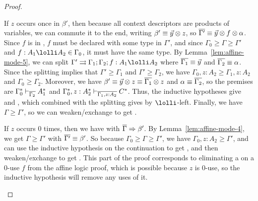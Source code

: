 \begin{proof}
\begin{itemize}
  If $z$ occurs once in $\beta'$, then because all context descriptors
  are products of variables, we can commute it to the end, writing
  $\beta' \equiv \vec{y} \otimes z$, so $\overline{\Gamma'} \equiv \vec{y}
  \otimes f \otimes \alpha$.  Since $f$ is in , $f$ must
  be declared with some type in $\Gamma'$, and since $\Gamma_0 \ge
  \Gamma \ge \Gamma'$ and $f:A_1 \lolli A_2 \in \Gamma_0$, it must have
  the same type.  By Lemma~\ref{lem:affine-mode-5}, we can split
  $\Gamma' \splits \Gamma_1;\Gamma_2;f:A_1 \lolli A_2$ where
  $\overline{\Gamma_1} \equiv \vec{y}$ and $\overline{\Gamma_2} \equiv \alpha$.
  Since the splitting implies that $\Gamma' \ge \Gamma_1$ and $\Gamma'
  \ge \Gamma_2$, we have $\Gamma_0,z:A_2 \ge \Gamma_1,z:A_2$ and
  $\Gamma_0 \ge \Gamma_2$.  Moreover, we have $\beta' \equiv \vec{y}
  \otimes z \equiv \overline{\Gamma_1} \otimes z$ and $\alpha \equiv
  \overline{\Gamma_2}$, so the premises are
  $\Gamma_0^* \vdash_{\overline{\Gamma_2}} A_1^*$ and
  $\Gamma_0^*,z:A_2^* \vdash_{\overline{\Gamma_1,z:A_2}} C^*$.  Thus, the
  inductive hypotheses give  and
  , which combined with the splitting gives
   by $\lolli$-left.  Finally, we have $\Gamma \ge
  \Gamma'$, so we can weaken/exchange to get .

  If $z$ occurs 0 times, then we have
   with $\overline{\Gamma} \Rightarrow \beta'$.
  By Lemma~\ref{lem:affine-mode-4}, we get $\Gamma \ge \Gamma'$ with
  $\overline{\Gamma'} \equiv \beta'$. So because $\Gamma_0 \ge \Gamma \ge
  \Gamma'$, we have $\Gamma_0,z:A_2 \ge \Gamma'$, and can use the
  inductive hypothesis on the continuation to get , and
  then weaken/exchange to get . This part of the proof
  corresponds to eliminating a \UL\/ on a 0-use $f$ from the affine
  logic proof, which is possible because $z$ is 0-use, so the inductive
  hypothesis will remove any uses of it.
\end{itemize}
\end{proof}
